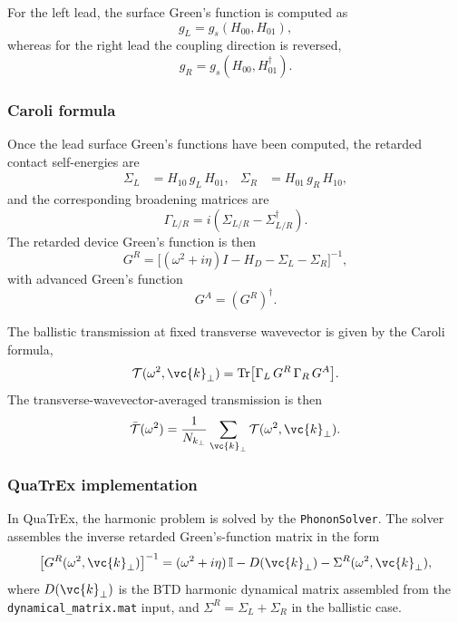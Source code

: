 For the left lead, the surface Green's function is computed as
\begin{equation}
  g_L = g_s(H_{00},H_{01}),
\end{equation}
whereas for the right lead the coupling direction is reversed,
\begin{equation}
  g_R = g_s(H_{00},H_{01}^\dagger).
\end{equation}

\subsubsection{Caroli formula}

Once the lead surface Green's functions have been computed, the retarded
contact self-energies are
\begin{align}
  \Sigma_L &= H_{10}\,g_L\,H_{01}, &
  \Sigma_R &= H_{01}\,g_R\,H_{10},
\end{align}
and the corresponding broadening matrices are
\begin{equation}
  \Gamma_{L/R} = i(\Sigma_{L/R} - \Sigma_{L/R}^\dagger).
\end{equation}
The retarded device Green's function is then
\begin{equation}
  G^R
  = \bigl[(\omega^2+i\eta)I - H_D - \Sigma_L - \Sigma_R\bigr]^{-1},
\end{equation}
with advanced Green's function
\begin{equation}
  G^A = (G^R)^\dagger.
\end{equation}

The ballistic transmission at fixed transverse wavevector is given by
the Caroli formula,
\begin{equation}\label{eq:caroli}
  \mathcal{T}(\omega^2,\vc{k}_\perp)
  = \mathrm{Tr}\bigl[\Gamma_L\,G^R\,\Gamma_R\,G^A\bigr].
\end{equation}
The transverse-wavevector-averaged transmission is then
\begin{equation}
  \bar{\mathcal{T}}(\omega^2)
  = \frac{1}{N_{k_\perp}}
    \sum_{\vc{k}_\perp}
    \mathcal{T}(\omega^2,\vc{k}_\perp).
\end{equation}

\subsubsection{QuaTrEx implementation}
\label{sec:phonon_solver}

In QuaTrEx, the harmonic problem is solved by the
\texttt{PhononSolver}.  The solver assembles the inverse retarded
Green's-function matrix in the form
\begin{equation}\label{eq:system}
  \bigl[G^R(\omega^2,\vc{k}_\perp)\bigr]^{-1}
  = (\omega^2+i\eta)\,\mathbb{I}
    - D(\vc{k}_\perp)
    - \Sigma^R(\omega^2,\vc{k}_\perp),
\end{equation}
where $D(\vc{k}_\perp)$ is the BTD harmonic dynamical matrix assembled
from the \texttt{dynamical\_matrix.mat} input, and
$\Sigma^R = \Sigma_L + \Sigma_R$ in the ballistic case.

